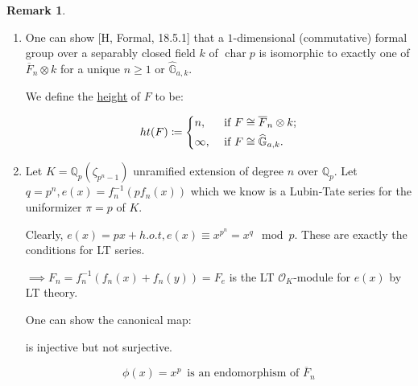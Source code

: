 \documentclass{article}
\theoremstyle{definition}
\numberwithin{theorem}{subsection}
\newtheorem*{remark}{Remark}
\begin{document}
    \begin{remark}
        \begin{enumerate}[label=\arabic*)]
            \item One can show [H, Formal, 18.5.1] that a \(1\)-dimensional (commutative) formal group over a separably closed field \(k\) of \(\operatorname{char} p\) is isomorphic to exactly one of \(\overline{F}_n \otimes k\) for a unique \(n \geq 1\) or \(\widehat{\mathbb{G}}_{a,k}\).
            
            We define the \underline{height} of \(F\) to be:
            
            \[
                ht(F) \coloneqq \begin{dcases}
                    n, &\text{ if } F \cong \overline{F}_n \otimes k ;\\
                    \infty, &\text{ if } F \cong \widehat{\mathbb{G}}_{a,k}.
                \end{dcases}
            \]

            \item Let \(K = \mathbb{Q}_p (\zeta_{p^n - 1})\) unramified extension of degree \(n\) over \(\mathbb{Q}_p\). Let \(q = p^n, e(x) = f_n ^{-1} (p f_n(x))\) which we know is a Lubin-Tate series for the uniformizer \(\pi = p\) of \(K\).
            
            Clearly, \(e(x) = px + h.o.t, e(x) \equiv x^{p^n} = x^q \mod p\). These are exactly the conditions for LT series.

            \(\implies F_n = f_n ^{-1} (f_n(x) + f_n(y)) = F_e\) is the LT \(\mathcal{O}_K\)-module for \(e(x)\) by LT theory.

            One can show the canonical map:

            \begin{center}
            \end{center}

            is injective but not surjective.

            \[
                \phi(x) = x^p \, \text{ is an endomorphism of } \overline{F}_n
            \]


\end{enumerate}
\end{remark}
\end{document}
